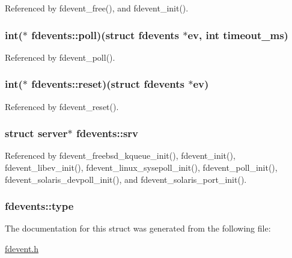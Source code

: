 Referenced by fdevent\-\_\-free(), and fdevent\-\_\-init().

\hypertarget{structfdevents_a45c7aaf2c8b8da25827f0c8a9a0e90c8}{
\subsubsection[{poll}]{\setlength{\rightskip}{0pt plus 5cm}int($\ast$ fdevents\-::poll)(struct {\bf fdevents} $\ast$ev, int timeout\-\_\-ms)}}\label{structfdevents_a45c7aaf2c8b8da25827f0c8a9a0e90c8}


Referenced by fdevent\-\_\-poll().

\hypertarget{structfdevents_a7b407184007244be141f57003a576fa0}{
\subsubsection[{reset}]{\setlength{\rightskip}{0pt plus 5cm}int($\ast$ fdevents\-::reset)(struct {\bf fdevents} $\ast$ev)}}\label{structfdevents_a7b407184007244be141f57003a576fa0}


Referenced by fdevent\-\_\-reset().

\hypertarget{structfdevents_a602f2ca1c249c833a4ecb0fc2bf00d31}{
\subsubsection[{srv}]{\setlength{\rightskip}{0pt plus 5cm}struct {\bf server}$\ast$ fdevents\-::srv}}\label{structfdevents_a602f2ca1c249c833a4ecb0fc2bf00d31}


Referenced by fdevent\-\_\-freebsd\-\_\-kqueue\-\_\-init(), fdevent\-\_\-init(), fdevent\-\_\-libev\-\_\-init(), fdevent\-\_\-linux\-\_\-sysepoll\-\_\-init(), fdevent\-\_\-poll\-\_\-init(), fdevent\-\_\-solaris\-\_\-devpoll\-\_\-init(), and fdevent\-\_\-solaris\-\_\-port\-\_\-init().

\hypertarget{structfdevents_a9656b863d74046158c2feddd57b46f01}{
\subsubsection[{type}]{ fdevents\-::type}}\label{structfdevents_a9656b863d74046158c2feddd57b46f01}


The documentation for this struct was generated from the following file\-:\begin{DoxyCompactItemize}
\item 
\hyperlink{fdevent_8h}{fdevent.\-h}\end{DoxyCompactItemize}
